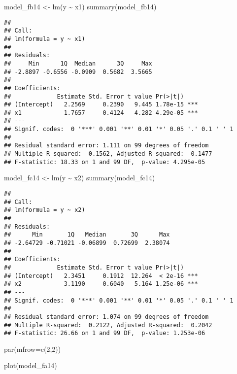 \documentclass[
]{article}
\newenvironment{Shaded}{\begin{snugshade}}{\end{snugshade}}
\newcommand{\AttributeTok}[1]{\textcolor[rgb]{0.77,0.63,0.00}{#1}}
\newcommand{\DecValTok}[1]{\textcolor[rgb]{0.00,0.00,0.81}{#1}}
\newcommand{\FunctionTok}[1]{\textcolor[rgb]{0.00,0.00,0.00}{#1}}
\newcommand{\NormalTok}[1]{#1}
\newcommand{\OtherTok}[1]{\textcolor[rgb]{0.56,0.35,0.01}{#1}}
\newcommand{\SpecialCharTok}[1]{\textcolor[rgb]{0.00,0.00,0.00}{#1}}
\begin{document}
\begin{Shaded}
\begin{Highlighting}[]
\NormalTok{model\_fb14 }\OtherTok{\textless{}{-}} \FunctionTok{lm}\NormalTok{(y }\SpecialCharTok{\textasciitilde{}}\NormalTok{ x1)}
\FunctionTok{summary}\NormalTok{(model\_fb14)}
\end{Highlighting}
\end{Shaded}

\begin{verbatim}
## 
## Call:
## lm(formula = y ~ x1)
## 
## Residuals:
##     Min      1Q  Median      3Q     Max 
## -2.8897 -0.6556 -0.0909  0.5682  3.5665 
## 
## Coefficients:
##             Estimate Std. Error t value Pr(>|t|)    
## (Intercept)   2.2569     0.2390   9.445 1.78e-15 ***
## x1            1.7657     0.4124   4.282 4.29e-05 ***
## ---
## Signif. codes:  0 '***' 0.001 '**' 0.01 '*' 0.05 '.' 0.1 ' ' 1
## 
## Residual standard error: 1.111 on 99 degrees of freedom
## Multiple R-squared:  0.1562, Adjusted R-squared:  0.1477 
## F-statistic: 18.33 on 1 and 99 DF,  p-value: 4.295e-05
\end{verbatim}

\begin{Shaded}
\begin{Highlighting}[]
\NormalTok{model\_fc14 }\OtherTok{\textless{}{-}} \FunctionTok{lm}\NormalTok{(y }\SpecialCharTok{\textasciitilde{}}\NormalTok{ x2)}
\FunctionTok{summary}\NormalTok{(model\_fc14)}
\end{Highlighting}
\end{Shaded}

\begin{verbatim}
## 
## Call:
## lm(formula = y ~ x2)
## 
## Residuals:
##      Min       1Q   Median       3Q      Max 
## -2.64729 -0.71021 -0.06899  0.72699  2.38074 
## 
## Coefficients:
##             Estimate Std. Error t value Pr(>|t|)    
## (Intercept)   2.3451     0.1912  12.264  < 2e-16 ***
## x2            3.1190     0.6040   5.164 1.25e-06 ***
## ---
## Signif. codes:  0 '***' 0.001 '**' 0.01 '*' 0.05 '.' 0.1 ' ' 1
## 
## Residual standard error: 1.074 on 99 degrees of freedom
## Multiple R-squared:  0.2122, Adjusted R-squared:  0.2042 
## F-statistic: 26.66 on 1 and 99 DF,  p-value: 1.253e-06
\end{verbatim}

\begin{Shaded}
\begin{Highlighting}[]
\FunctionTok{par}\NormalTok{(}\AttributeTok{mfrow=}\FunctionTok{c}\NormalTok{(}\DecValTok{2}\NormalTok{,}\DecValTok{2}\NormalTok{))}

\FunctionTok{plot}\NormalTok{(model\_fa14)}
\end{Highlighting}
\end{Shaded}
\end{document}
